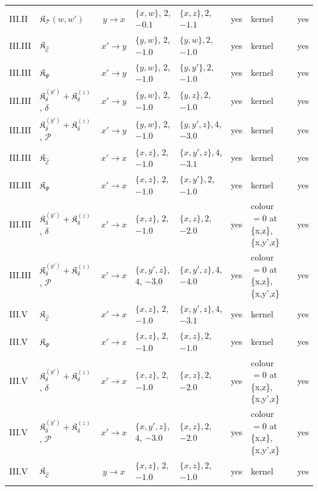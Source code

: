 {\begin{center}
\begin{tabular}{|l|l|c|l|l|c|l|c|}
III.II & $\mathfrak K_{\mathcal T}(w,w')$ & $y\to x$ & $\{x,w\}$, $2$, $-0.1$ & $\{x,z\}, 2$, $-1.1$ & yes & kernel & yes\\
III.III & $\mathfrak K_{\widehat{\mathcal E}}$ & $x'\to y$ & $\{y,w\}$, $2$, $-1.0$ & $\{y,w\}, 2$, $-1.0$ & yes & kernel & yes\\
III.III & $\mathfrak K_\Psi$ & $x'\to y$ & $\{y,w\}$, $2$, $-1.0$ & $\{y,y'\}, 2$, $-1.0$ & yes & kernel & yes\\
III.III & $\mathfrak K_\delta^{(y')}{+}\mathfrak K_\delta^{(z)}$, $\delta$ & $x'\to y$ & $\{y,w\}$, $2$, $-1.0$ & $\{y,z\}, 2$, $-1.0$ & yes & kernel & yes\\
III.III & $\mathfrak K_\delta^{(y')}{+}\mathfrak K_\delta^{(z)}$, $\mathcal P$ & $x'\to y$ & $\{y,w\}$, $2$, $-1.0$ & $\{y,y',z\}, 4$, $-3.0$ & yes & kernel & yes\\
III.III & $\mathfrak K_{\widehat{\mathcal E}}$ & $x'\to x$ & $\{x,z\}$, $2$, $-1.0$ & $\{x,y',z\}, 4$, $-3.1$ & yes & kernel & yes\\
III.III & $\mathfrak K_\Psi$ & $x'\to x$ & $\{x,z\}$, $2$, $-1.0$ & $\{x,y'\}, 2$, $-1.0$ & yes & kernel & yes\\
III.III & $\mathfrak K_\delta^{(y')}{+}\mathfrak K_\delta^{(z)}$, $\delta$ & $x'\to x$ & $\{x,z\}$, $2$, $-1.0$ & $\{x,z\}, 2$, $-2.0$ & yes & colour $=0$ at \{x,z\}, \{x,y',z\} & yes\\
III.III & $\mathfrak K_\delta^{(y')}{+}\mathfrak K_\delta^{(z)}$, $\mathcal P$ & $x'\to x$ & $\{x,y',z\}$, $4$, $-3.0$ & $\{x,y',z\}, 4$, $-4.0$ & yes & colour $=0$ at \{x,z\}, \{x,y',z\} & yes\\
III.V & $\mathfrak K_{\widehat{\mathcal E}}$ & $x'\to x$ & $\{x,z\}$, $2$, $-1.0$ & $\{x,y',z\}, 4$, $-3.1$ & yes & kernel & yes\\
III.V & $\mathfrak K_\Psi$ & $x'\to x$ & $\{x,z\}$, $2$, $-1.0$ & $\{x,z\}, 2$, $-1.0$ & yes & kernel & yes\\
III.V & $\mathfrak K_\delta^{(y')}{+}\mathfrak K_\delta^{(z)}$, $\delta$ & $x'\to x$ & $\{x,z\}$, $2$, $-1.0$ & $\{x,z\}, 2$, $-2.0$ & yes & colour $=0$ at \{x,z\}, \{x,y',z\} & yes\\
III.V & $\mathfrak K_\delta^{(y')}{+}\mathfrak K_\delta^{(z)}$, $\mathcal P$ & $x'\to x$ & $\{x,y',z\}$, $4$, $-3.0$ & $\{x,z\}, 2$, $-2.0$ & yes & colour $=0$ at \{x,z\}, \{x,y',z\} & yes\\
III.V & $\mathfrak K_{\widehat{\mathcal E}}$ & $y\to x$ & $\{x,z\}$, $2$, $-1.0$ & $\{x,z\}, 2$, $-1.0$ & yes & kernel & yes\\

\end{tabular}
\end{center}}

